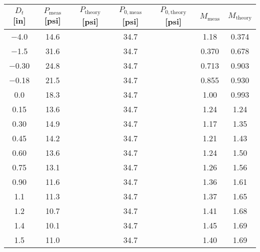 \begin{tabular}{ccccccc}
\toprule
$D_t$ [\unit{in}] & $P_\text{meas}$ [\unit{psi}] & $P_\text{theory}$ [\unit{psi}] & $P_{0,\text{meas}}$ [\unit{psi}] & $P_{0,\text{theory}}$ [\unit{psi}] & $M_\text{meas}$ & $M_\text{theory}$ \\
\midrule
\num{-4.0} & \num{14.6} &  & \num{34.7} &  & \num{1.18} & \num{0.374} \\ 
\num{-1.5} & \num{31.6} &  & \num{34.7} &  & \num{0.370} & \num{0.678} \\ 
\num{-0.30} & \num{24.8} &  & \num{34.7} &  & \num{0.713} & \num{0.903} \\ 
\num{-0.18} & \num{21.5} &  & \num{34.7} &  & \num{0.855} & \num{0.930} \\ 
\num{0.0} & \num{18.3} &  & \num{34.7} &  & \num{1.00} & \num{0.993} \\ 
\num{0.15} & \num{13.6} &  & \num{34.7} &  & \num{1.24} & \num{1.24} \\ 
\num{0.30} & \num{14.9} &  & \num{34.7} &  & \num{1.17} & \num{1.35} \\ 
\num{0.45} & \num{14.2} &  & \num{34.7} &  & \num{1.21} & \num{1.43} \\ 
\num{0.60} & \num{13.6} &  & \num{34.7} &  & \num{1.24} & \num{1.50} \\ 
\num{0.75} & \num{13.1} &  & \num{34.7} &  & \num{1.26} & \num{1.56} \\ 
\num{0.90} & \num{11.6} &  & \num{34.7} &  & \num{1.36} & \num{1.61} \\ 
\num{1.1} & \num{11.3} &  & \num{34.7} &  & \num{1.37} & \num{1.65} \\ 
\num{1.2} & \num{10.7} &  & \num{34.7} &  & \num{1.41} & \num{1.68} \\ 
\num{1.4} & \num{10.1} &  & \num{34.7} &  & \num{1.45} & \num{1.69} \\ 
\num{1.5} & \num{11.0} &  & \num{34.7} &  & \num{1.40} & \num{1.69} \\ 
\bottomrule
\end{tabular}
